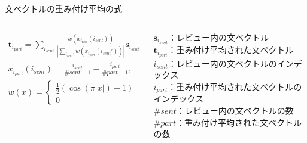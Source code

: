 \documentclass[aspectratio=43,unicode,10pt]{beamer}
\newlength{\mycolumnwidth}
\begin{document}
\begin{frame}{文ベクトルの重み付け平均の式}{}
  \begin{columns}
    \begin{column}{\mycolumnwidth}
      \begin{gather*}
        \mathbf{t}_{i_{part}} = \sum_{i_{sent}}
                                \frac{w(x_{i_{part}}(i_{sent}))}
                                     {|\sum_{i_{sent}'}
                                      w(x_{i_{part}}(i_{sent}'))|}
                                \mathbf{s}_{i_{sent}}, \\
        x_{i_{part}}(i_{sent}) = \frac{i_{sent}}{\#sent - 1}
                                 - \frac{i_{part}}{\#part - 1}, \\
        w(x) = \begin{cases}
          \frac{1}{2} (\cos(\pi|x|) + 1) & \text{if $|x| \leq 1$} \\
          0 & \text{otherwise}
        \end{cases}
      \end{gather*}
    \end{column}
    \begin{column}{\mycolumnwidth}
      \footnotesize
      $\mathbf{s}_{i_{sent}}$：レビュー内の文ベクトル \\
      $\mathbf{t}_{i_{part}}$：重み付け平均された文ベクトル \\
      $i_{sent}$：レビュー内の文ベクトルのインデックス \\
      $i_{part}$：重み付け平均された文ベクトルのインデックス \\
      $\#sent$：レビュー内の文ベクトルの数 \\
      $\#part$：重み付け平均された文ベクトルの数
    \end{column}
  \end{columns}
\end{frame}
\end{document}
